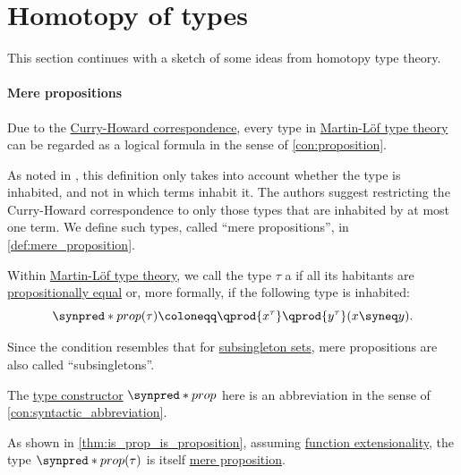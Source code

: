\section{Homotopy of types}\label{sec:homotopy_of_types}

This section continues  with a sketch of some ideas from homotopy type theory.

\paragraph{Mere propositions}

\begin{remark}\label{rem:mere_propositions}
  Due to the \hyperref[con:curry_howard_correspondence]{Curry-Howard correspondence}, every type in \hyperref[def:martin_lof_type_theory]{Martin-L\"of type theory} can be regarded as a logical formula in the sense of \cref{con:proposition}.

  As noted in \cite[111]{UnivalentFoundationsProgram2013HoTT}, this definition only takes into account whether the type is inhabited, and not in which terms inhabit it. The authors suggest restricting the Curry-Howard correspondence to only those types that are inhabited by at most one term. We define such types, called \enquote{mere propositions}, in \cref{def:mere_proposition}.
\end{remark}

\begin{definition}\label{def:mere_proposition}
  Within \hyperref[def:martin_lof_type_theory]{Martin-L\"of type theory}, we call the type \( \tau \) a  if all its habitants are \hyperref[def:mltt_propositional_equality]{propositionally equal} or, more formally, if the following type is inhabited:
  \begin{equation*}
    \synpred*{prop}(\tau) \coloneqq \qprod {x^\tau} \qprod {y^\tau} (x \syneq y).
  \end{equation*}
\end{definition}
\begin{comments}
  \item Since the condition resembles that for \hyperref[def:subsingleton_set]{subsingleton sets}, mere propositions are also called \enquote{subsingletons}.

  \item The \hyperref[con:type_constructor]{type constructor} \( \synpred*{prop} \) here is an abbreviation in the sense of \cref{con:syntactic_abbreviation}.

  \item As shown in \cref{thm:is_prop_is_proposition}, assuming \hyperref[def:function_extensionality_axiom]{function extensionality}, the type \( \synpred*{prop}(\tau) \) is itself \hyperref[def:mere_proposition]{mere proposition}.
\end{comments}

